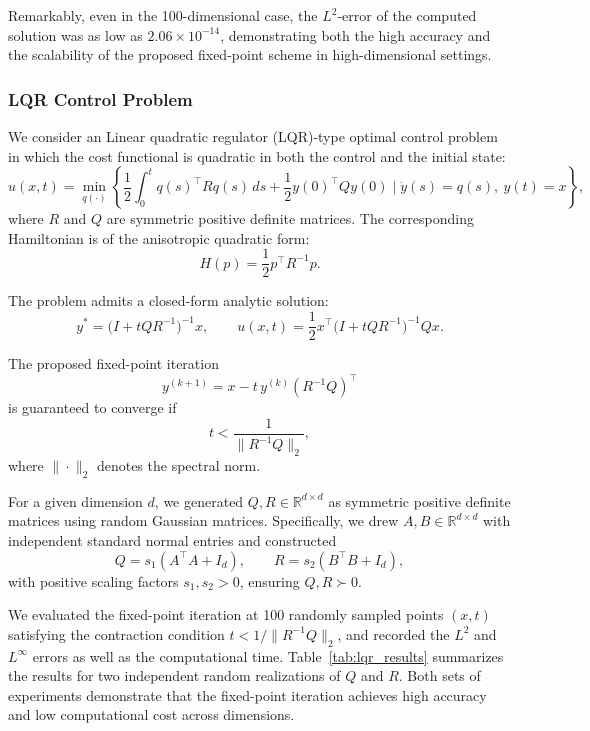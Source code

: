 \documentclass[review,hidelinks,onefignum,onetabnum]{siamart250106}
\begin{document}
Remarkably, even in the 100-dimensional case, the $L^2$-error of the computed solution was as low as $2.06 \times 10^{-14}$, demonstrating both the high accuracy and the scalability of the proposed fixed-point scheme in high-dimensional settings.

\subsubsection{LQR Control Problem}
We consider an Linear quadratic regulator (LQR)-type optimal control problem in which the cost functional is quadratic in both the control and the initial state:
\begin{equation}\label{eq:lqr_ocp}
u(x,t) = \min_{q(\cdot)} \left\{ \frac{1}{2} \int_0^t q(s)^\top R q(s)\, ds + \frac{1}{2} y(0)^\top Q y(0) \;\Big|\; 
\dot y(s) = q(s),\ y(t) = x \right\},
\end{equation}
where \(R\) and \(Q\) are symmetric positive definite matrices. The corresponding Hamiltonian is of the anisotropic quadratic form:
\[
H(p) = \frac{1}{2} p^\top R^{-1} p.
\]

The problem admits a closed-form analytic solution:
\begin{equation}
y^* = \big(I + t Q R^{-1} \big)^{-1} x, \qquad 
u(x,t) = \frac{1}{2} x^\top \big(I + t Q R^{-1}\big)^{-1} Q x.
\end{equation}

The proposed fixed-point iteration
\[
y^{(k+1)} = x - t \, y^{(k)} (R^{-1} Q)^\top
\]
is guaranteed to converge if 
\[
t < \frac{1}{\|R^{-1} Q\|_2},
\]
where \(\| \cdot \|_2\) denotes the spectral norm.

For a given dimension \(d\), we generated \(Q, R \in \mathbb{R}^{d \times d}\) as symmetric positive definite matrices using random Gaussian matrices. Specifically, we drew \(A, B \in \mathbb{R}^{d \times d}\) with independent standard normal entries and constructed
\[
Q = s_1 (A^\top A + I_d), \qquad 
R = s_2 (B^\top B + I_d),
\]
with positive scaling factors \(s_1, s_2 > 0\), ensuring \(Q, R \succ 0\).

We evaluated the fixed-point iteration at 100 randomly sampled points \((x,t)\) satisfying the contraction condition \(t < 1/\|R^{-1} Q\|_2\), and recorded the \(L^2\) and \(L^\infty\) errors as well as the computational time. Table~\ref{tab:lqr_results} summarizes the results for two independent random realizations of \(Q\) and \(R\). Both sets of experiments demonstrate that the fixed-point iteration achieves high accuracy and low computational cost across dimensions.
\end{document}

